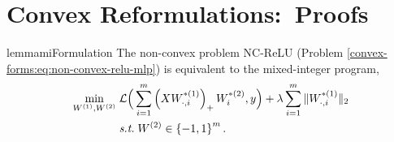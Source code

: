 
\section{Convex Reformulations:\ Proofs}\label{app:convex-forms}

\begin{restatable}{lemma}{miFormulation}\label{lemma:mi-reformulation}
    The non-convex problem NC-ReLU (Problem \ref{convex-forms:eq:non-convex-relu-mlp}) is equivalent to the mixed-integer program,
    \begin{equation}\label{convex-forms:eq:mi-reformulation}
        \begin{aligned}
            \min_{W^{(1)}, W^{(2)}} \; & \mathcal{L}\Big(\sum_{i = 1}^m \left(X W^{*(1)}_{\cdot, i}\right)_+ W^{*(2)}_{i}, y\Big) + \lambda \sum_{i = 1}^m \|W^{*(1)}_{\cdot, i}\|_2 \\
                                       & \text{\emph{s.t.}} \; W^{(2)} \in \left\{-1, 1\right\}^m.
        \end{aligned}
    \end{equation}
\end{restatable}

